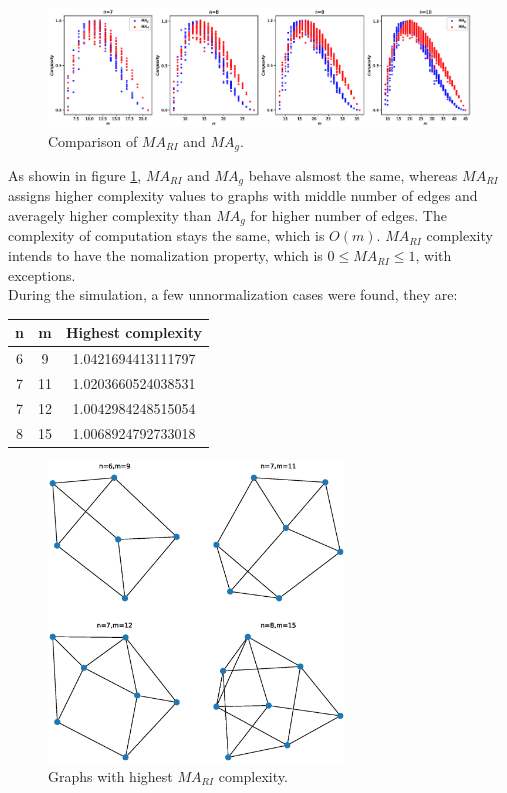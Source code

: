 \documentclass[12pt]{article}
\begin{document}
\begin{figure}[ht]
    \centering
    \includegraphics[width=\textwidth]{mag&mari.eps}
    \caption{Comparison of $MA_{RI}$ and $MA_{g}$.}
    \label{fig:mari&mag}
\end{figure}
\noindent
As showin in figure \ref{fig:mari&mag}, $MA_{RI}$ and $MA_{g}$ behave alsmost the same, whereas $MA_{RI}$ assigns higher complexity values to graphs with middle number of edges and averagely higher complexity than $MA_{g}$ for higher number of edges. The complexity of computation stays the same, which is $O(m)$. $MA_{RI}$ complexity intends to have the nomalization property, which is $0\leq MA_{RI}\leq 1$, with exceptions.\\
During the simulation, a few unnormalization cases were found, they are:\\
\begin{table}[h]
    \centering
    \begin{tabular}{|c|c|c|}
        \hline
        n & m & Highest complexity\\
        \hline
        6 & 9 & 1.0421694413111797\\
        \hline
        7 & 11 & 1.0203660524038531\\
        \hline
        7 & 12 & 1.0042984248515054\\
        \hline
        8 & 15 & 1.0068924792733018\\
        \hline
    \end{tabular}
\end{table}
\begin{figure}[ht]
    \centering
    \includegraphics[width=0.7\textwidth]{mari_exception.eps}
    \caption{Graphs with highest $MA_{RI}$ complexity.}
    \label{fig:mari_execption}
\end{figure}
\end{document}

